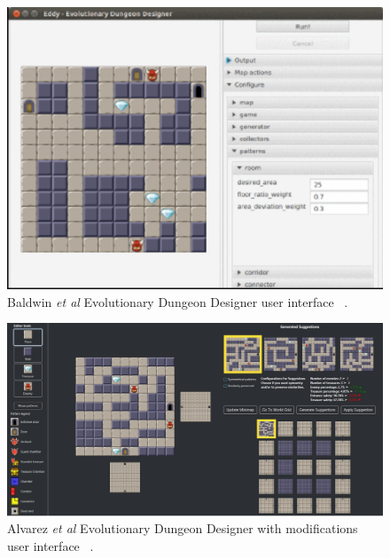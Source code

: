 \documentclass[journal]{IEEEtran}
\begin{document}
\begin{figure}[h]
	\includegraphics[width=1.0\linewidth]{EDD.PNG}
	\caption{ Baldwin \textit{et al} Evolutionary Dungeon Designer user interface ~\cite{baldwin2017mixed}.}
	\label{EDD}
\end{figure} 

\begin{figure}[h]
	\includegraphics[width=1.0\linewidth]{EDD2.PNG}
	\caption{ Alvarez \textit{et al} Evolutionary Dungeon Designer with modifications user interface ~\cite{alvarez2018fostering}.}
	\label{EDD2}
\end{figure} 
\end{document}
